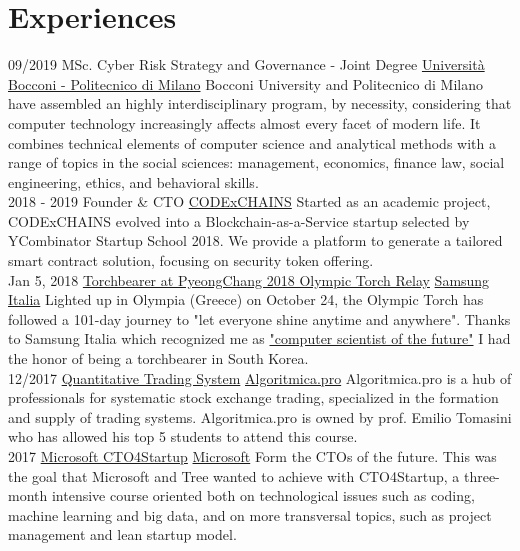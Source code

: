 \documentclass[]{friggeri-cv}
\begin{document}
\section{Experiences}
\begin{entrylist}
 \entry
    {09/2019}
    {MSc. Cyber Risk Strategy and Governance - Joint Degree}
    { \href{https://www.unibocconi.eu/wps/wcm/connect/bocconi/sitopubblico_en/navigation+tree/home/programs/master+of+science/cyber+risk+strategy+and+governance}{Università Bocconi - Politecnico di Milano}}
    {Bocconi University and Politecnico di Milano have assembled an highly interdisciplinary program, by necessity, considering that computer technology increasingly affects almost every facet of modern life. It combines technical elements of computer science and analytical methods with a range of topics in the social sciences: management, economics, finance law, social engineering, ethics, and behavioral skills.  \\}
    \entry
    {2018 - 2019}
    {Founder \& CTO}
    { \href{http://www.codexchains.com/}{CODExCHAINS}}
    {Started as an academic project, CODExCHAINS evolved into a Blockchain-as-a-Service startup selected by YCombinator Startup School 2018. We provide a platform to generate a tailored smart contract solution, focusing on security token offering. \\}
    \entry
    {Jan 5, 2018}
    {\href{https://www.pyeongchang2018.com/en/torch-relay/index}{Torchbearer at PyeongChang 2018 Olympic Torch Relay}}
    { \href{http://www.samsung.com/it/}{Samsung Italia}}
    {Lighted up in Olympia (Greece) on October 24, the Olympic Torch has followed a 101-day journey to "let everyone shine anytime and anywhere". Thanks to Samsung Italia which recognized me as \href{http://www.samsung.com/it/diventatedoforo/}{"computer scientist of the future"} I had the honor of being a torchbearer in South Korea.\\}
    \entry
    {12/2017}
    {\href{http://www.algoritmica.pro/corsi-trading-systems/}{Quantitative Trading System}}
    {\href{http://www.algoritmica.pro/}{Algoritmica.pro}}
    {Algoritmica.pro is a hub of professionals for systematic stock exchange trading, specialized in the formation and supply of trading systems. 
    Algoritmica.pro is owned by prof. Emilio Tomasini who has allowed his top 5 students to attend this course.\\}
    \entry
    {2017}
    {\href{https://www.facebook.com/CTO4Startup/}{Microsoft CTO4Startup}}
    {\href{https://www.microsoft.com}{Microsoft}}
    {Form the CTOs of the future. This was the goal that Microsoft and Tree wanted to achieve with CTO4Startup, a three-month intensive course oriented both on technological issues such as coding, machine learning and big data, and on more transversal topics, such as project management and lean startup model.
}
\end{entrylist}
\end{document}

